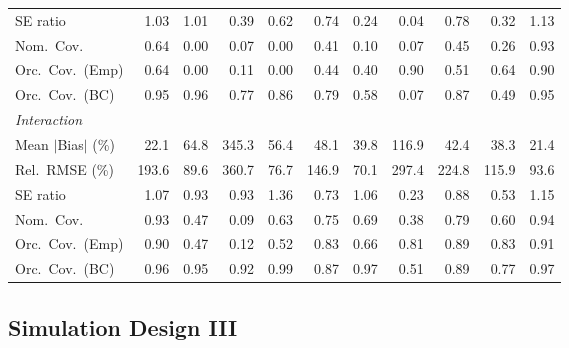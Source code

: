 \begin{table}[!htbp]
{\begin{tabular}{lrrrrrrrrrr}
\quad SE ratio & \cellcolor{ranktwo}1.03 & \cellcolor{rankone}1.01 & 0.39 & 0.62 & 0.74 & 0.24 & 0.04 & 0.78 & 0.32 & \cellcolor{rankthree}1.13 \\
\quad Nom.\ Cov. & \cellcolor{ranktwo}0.64 & 0.00 & 0.07 & 0.00 & 0.41 & 0.10 & 0.07 & \cellcolor{rankthree}0.45 & 0.26 & \cellcolor{rankone}0.93 \\
\quad Orc.\ Cov.\ (Emp) & \cellcolor{ranktwo}0.64 & 0.00 & 0.11 & 0.00 & 0.44 & 0.40 & \cellcolor{rankone}0.90 & \cellcolor{rankthree}0.51 & \cellcolor{ranktwo}0.64 & \cellcolor{rankone}0.90 \\
\quad Orc.\ Cov.\ (BC) & \cellcolor{rankone}0.95 & \cellcolor{ranktwo}0.96 & 0.77 & 0.86 & 0.79 & 0.58 & 0.07 & \cellcolor{rankthree}0.87 & 0.49 & \cellcolor{rankone}0.95 \\
\midrule
\multicolumn{11}{l}{\textit{Interaction}} \\[2pt]
\quad Mean $|$Bias$|$ (\%) & \cellcolor{ranktwo}22.1 & 64.8 & 345.3 & 56.4 & 48.1 & 39.8 & 116.9 & 42.4 & \cellcolor{rankthree}38.3 & \cellcolor{rankone}21.4 \\
\quad Rel.\ RMSE (\%) & 193.6 & \cellcolor{rankthree}89.6 & 360.7 & \cellcolor{ranktwo}76.7 & 146.9 & \cellcolor{rankone}70.1 & 297.4 & 224.8 & 115.9 & 93.6 \\
\quad SE ratio & \cellcolor{ranktwo}1.07 & \cellcolor{ranktwo}0.93 & \cellcolor{ranktwo}0.93 & 1.36 & 0.73 & \cellcolor{rankone}1.06 & 0.23 & \cellcolor{rankthree}0.88 & 0.53 & 1.15 \\
\quad Nom.\ Cov. & \cellcolor{ranktwo}0.93 & 0.47 & 0.09 & 0.63 & 0.75 & 0.69 & 0.38 & \cellcolor{rankthree}0.79 & 0.60 & \cellcolor{rankone}0.94 \\
\quad Orc.\ Cov.\ (Emp) & \cellcolor{ranktwo}0.90 & 0.47 & 0.12 & 0.52 & 0.83 & 0.66 & 0.81 & \cellcolor{rankthree}0.89 & 0.83 & \cellcolor{rankone}0.91 \\
\quad Orc.\ Cov.\ (BC) & \cellcolor{ranktwo}0.96 & \cellcolor{rankone}0.95 & 0.92 & 0.99 & 0.87 & \cellcolor{rankthree}0.97 & 0.51 & 0.89 & 0.77 & \cellcolor{rankthree}0.97 \\
\bottomrule
\end{tabular}}
\end{table}

\subsection{Simulation Design III}
\label{sec:sird_sim_surv}

